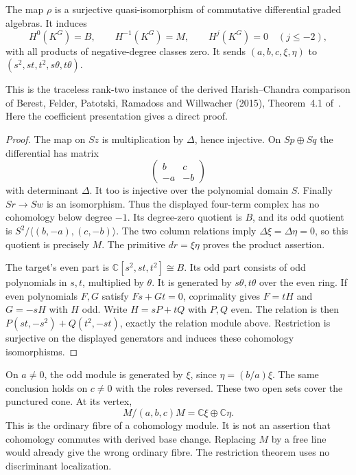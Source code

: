 \begin{theorem}\label{thm:vol2-classical-rank-two-restriction}
The map $\rho$ is a surjective quasi-isomorphism of commutative
differential graded algebras. It induces
\[
 H^0(K^G)=B,\qquad H^{-1}(K^G)=M,\qquad
 H^j(K^G)=0\quad(j\leq-2),
\]
with all products of negative-degree classes zero.
It sends $(a,b,c,\xi,\eta)$ to
$(s^2,st,t^2,s\theta,t\theta)$.
\end{theorem}

This is the traceless rank-two instance of the derived
Harish--Chandra comparison of Berest, Felder, Patotski, Ramadoss and
Willwacher (2015), Theorem~4.1 of~\cite{BFPRW2015}.
Here the coefficient presentation gives a direct proof.

\begin{proof}
The map on $Sz$ is multiplication by $\Delta$, hence injective.
On $Sp\oplus Sq$ the differential has matrix
\[
 \begin{pmatrix}b&c\\-a&-b\end{pmatrix}
\]
with determinant $\Delta$. It too is injective over the polynomial
domain $S$. Finally $Sr\to Sw$ is an isomorphism.
Thus the displayed four-term complex has no cohomology below
degree $-1$. Its degree-zero quotient is $B$, and its odd quotient is
$S^2/\langle(b,-a),(c,-b)\rangle$.
The two column relations imply $\Delta\xi=\Delta\eta=0$, so this
quotient is precisely $M$. The primitive $dr=\xi\eta$ proves
the product assertion.

The target's even part is
$\mathbb C[s^2,st,t^2]\cong B$. Its odd part consists of odd
polynomials in $s,t$, multiplied by $\theta$. It is generated by
$s\theta,t\theta$ over the even ring.
If even polynomials $F,G$ satisfy $Fs+Gt=0$, coprimality gives
$F=tH$ and $G=-sH$ with $H$ odd. Write $H=sP+tQ$ with $P,Q$
even. The relation is then
$P(st,-s^2)+Q(t^2,-st)$, exactly the relation module above.
Restriction is surjective on the displayed generators and induces
these cohomology isomorphisms.
\end{proof}

On $a\ne0$, the odd module is generated by $\xi$, since
$\eta=(b/a)\xi$. The same conclusion holds on $c\ne0$ with the
roles reversed. These two open sets cover the punctured cone.
At its vertex,
\begin{equation}\label{eq:vol2-rank-two-odd-vertex}
 M/(a,b,c)M=\mathbb C\xi\oplus\mathbb C\eta.
\end{equation}
This is the ordinary fibre of a cohomology module. It is not an
assertion that cohomology commutes with derived base change.
Replacing $M$ by a free line would already give the wrong ordinary
fibre. The restriction theorem uses no discriminant localization.

